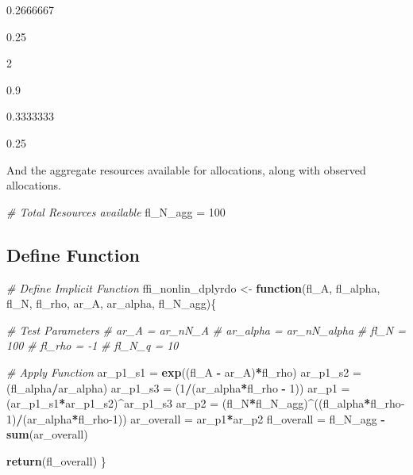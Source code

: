 \documentclass[
]{article}
\newenvironment{Shaded}{\begin{snugshade}}{\end{snugshade}}
\newcommand{\CommentTok}[1]{\textcolor[rgb]{0.56,0.35,0.01}{\textit{#1}}}
\newcommand{\ControlFlowTok}[1]{\textcolor[rgb]{0.13,0.29,0.53}{\textbf{#1}}}
\newcommand{\DecValTok}[1]{\textcolor[rgb]{0.00,0.00,0.81}{#1}}
\newcommand{\KeywordTok}[1]{\textcolor[rgb]{0.13,0.29,0.53}{\textbf{#1}}}
\newcommand{\NormalTok}[1]{#1}
\newcommand{\OperatorTok}[1]{\textcolor[rgb]{0.81,0.36,0.00}{\textbf{#1}}}
\newcommand{\StringTok}[1]{\textcolor[rgb]{0.31,0.60,0.02}{#1}}
\begin{document}
0.2666667

0.25

2

0.9

0.3333333

0.25

And the aggregate resources available for allocations, along with
observed allocations.

\begin{Shaded}
\begin{Highlighting}[]
\CommentTok{# Total Resources available}
\NormalTok{fl_N_agg =}\StringTok{ }\DecValTok{100}
\end{Highlighting}
\end{Shaded}

\hypertarget{define-function}{%
\subsection{Define Function}\label{define-function}}

\begin{Shaded}
\begin{Highlighting}[]
\CommentTok{# Define Implicit Function}
\NormalTok{ffi_nonlin_dplyrdo <-}\StringTok{ }\ControlFlowTok{function}\NormalTok{(fl_A, fl_alpha, fl_N, fl_rho, ar_A, ar_alpha, fl_N_agg)\{}

  \CommentTok{# Test Parameters}
  \CommentTok{# ar_A = ar_nN_A}
  \CommentTok{# ar_alpha = ar_nN_alpha}
  \CommentTok{# fl_N = 100}
  \CommentTok{# fl_rho = -1}
  \CommentTok{# fl_N_q = 10}

  \CommentTok{# Apply Function}
\NormalTok{  ar_p1_s1 =}\StringTok{ }\KeywordTok{exp}\NormalTok{((fl_A }\OperatorTok{-}\StringTok{ }\NormalTok{ar_A)}\OperatorTok{*}\NormalTok{fl_rho)}
\NormalTok{  ar_p1_s2 =}\StringTok{ }\NormalTok{(fl_alpha}\OperatorTok{/}\NormalTok{ar_alpha)}
\NormalTok{  ar_p1_s3 =}\StringTok{ }\NormalTok{(}\DecValTok{1}\OperatorTok{/}\NormalTok{(ar_alpha}\OperatorTok{*}\NormalTok{fl_rho }\OperatorTok{-}\StringTok{ }\DecValTok{1}\NormalTok{))}
\NormalTok{  ar_p1 =}\StringTok{ }\NormalTok{(ar_p1_s1}\OperatorTok{*}\NormalTok{ar_p1_s2)}\OperatorTok{^}\NormalTok{ar_p1_s3}
\NormalTok{  ar_p2 =}\StringTok{ }\NormalTok{(fl_N}\OperatorTok{*}\NormalTok{fl_N_agg)}\OperatorTok{^}\NormalTok{((fl_alpha}\OperatorTok{*}\NormalTok{fl_rho}\DecValTok{-1}\NormalTok{)}\OperatorTok{/}\NormalTok{(ar_alpha}\OperatorTok{*}\NormalTok{fl_rho}\DecValTok{-1}\NormalTok{))}
\NormalTok{  ar_overall =}\StringTok{ }\NormalTok{ar_p1}\OperatorTok{*}\NormalTok{ar_p2}
\NormalTok{  fl_overall =}\StringTok{ }\NormalTok{fl_N_agg }\OperatorTok{-}\StringTok{ }\KeywordTok{sum}\NormalTok{(ar_overall)}

  \KeywordTok{return}\NormalTok{(fl_overall)}
\NormalTok{\}}
\end{Highlighting}
\end{Shaded}
\end{document}

